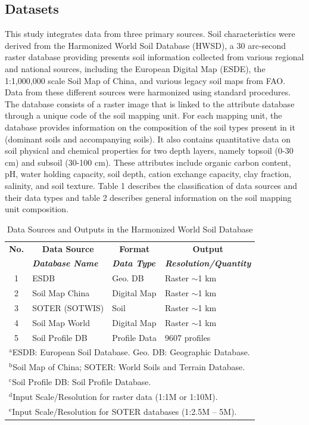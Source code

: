 \subsection{Datasets}
This study integrates data from three primary sources. Soil characteristics were derived from the Harmonized World Soil Database (HWSD), a 30 arc-second raster database providing presents soil information collected from various regional and national sources, including the European Digital Map (ESDE), the 1:1,000,000 scale Soil Map of China, and various legacy soil maps from FAO. Data from these different sources were harmonized using standard procedures. The database consists of a raster image that is linked to the attribute database through a unique code of the soil mapping unit. For each mapping unit, the database provides information on the composition of the soil types present in it (dominant soils and accompanying soils). It also contains quantitative data on soil physical and chemical properties for two depth layers, namely topsoil (0-30 cm) and subsoil (30-100 cm). These attributes include organic carbon content, pH, water holding capacity, soil depth, cation exchange capacity, clay fraction, salinity, and soil texture. Table 1 describes the classification of data sources and their data types and table 2 describes general information on the soil mapping unit composition.

\begin{table}[H]
\caption{Data Sources and Outputs in the Harmonized World Soil Database}
\centering
\begin{tabular}{|c|l|l|l|} %
\hline
\textbf{No.} & \multicolumn{1}{|c|}{\textbf{Data Source}} & \multicolumn{1}{|c|}{\textbf{Format}} & \multicolumn{1}{|c|}{\textbf{Output}} \\
\cline{2-4} %
\textbf{} & \textbf{\textit{Database Name}} & \textbf{\textit{Data Type}} & \textbf{\textit{Resolution/Quantity}} \\
\hline
1 & ESDB & Geo. DB & Raster $\sim$1 km \\
\hline
2 & Soil Map China & Digital Map & Raster $\sim$1 km \\
\hline
3 & SOTER (SOTWIS) & Soil & Raster $\sim$1 km \\
\hline
4 & Soil Map World & Digital Map & Raster $\sim$1 km \\
\hline
5 & Soil Profile DB & Profile Data & 9607 profiles \\
\hline
\multicolumn{4}{l}{$^{\mathrm{a}}$ESDB: European Soil Database. Geo. DB: Geographic Database.} \\
\multicolumn{4}{l}{$^{\mathrm{b}}$Soil Map of China; SOTER: World Soils and Terrain Database.} \\
\multicolumn{4}{l}{$^{\mathrm{c}}$Soil Profile DB: Soil Profile Database.} \\
\multicolumn{4}{l}{$^{\mathrm{d}}$Input Scale/Resolution for raster data (1:1M or 1:10M).} \\
\multicolumn{4}{l}{$^{\mathrm{e}}$Input Scale/Resolution for SOTER databases (1:2.5M – 5M).}
\end{tabular}
\label{tab:hwsd_sources_compact}
\end{table}

